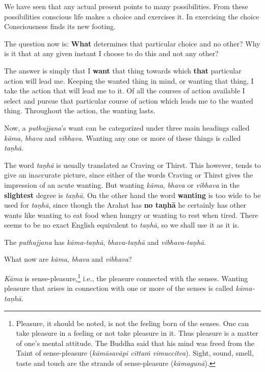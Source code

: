 We have seen that any actual present points to many possibilities. From
these possibilities conscious life makes a choice and exercises it. In
exercising the choice Consciousness finds its new footing.


The question now is: \textbf{What} determines that particular choice and no
other? Why is it that at any given instant I choose to do this and not
any other?


The answer is simply that I \textbf{want} that thing towards which \textbf{that}
particular action will lead me. Keeping the wanted thing in mind, or
wanting that thing, I take the action that will lead me to it. Of all
the courses of action available I select and pursue that particular
course of action which leads me to the wanted thing. Throughout the
action, the wanting lasts.


Now, a \emph{puthujjana}'s want can be categorized under three main
headings called \emph{kāma}, \emph{bhava} and \emph{vibhava}. Wanting any one or
more of these things is called \emph{taṇhā}.


The word \emph{taṇhā} is usually translated as Craving or Thirst. This
however, tends to give an inaccurate picture, since either of the words
Craving or Thirst gives the impression of an acute wanting. But wanting
\emph{kāma}, \emph{bhava} or \emph{vibhava} in the \textbf{slightest} degree is \emph{taṇhā}.
On the other hand the word \textbf{wanting} is too wide to be used for
\emph{taṇhā}, since though the Arahat has \textbf{no taṇhā} he certainly has other
wants like wanting to eat food when hungry or wanting to rest when
tired. There seems to be no exact English equivalent to \emph{taṇhā}, so we
shall use it as it is.


The \emph{puthujjana} has \emph{kāma-taṇhā}, \emph{bhava-taṇhā} and \emph{vibhava-taṇhā}.


What now are \emph{kāma}, \emph{bhava} and \emph{vibhava}?


\emph{Kāma} is sense-pleasure,\footnote{Pleasure, it should be noted, is not the feeling born of the senses. One can take pleasure in a feeling or not take pleasure in it. Thus pleasure is a matter of one’s mental attitude. The Buddha said that his mind was freed from the Taint of sense-pleasure (\emph{kāmāsavāpi cittaṁ vimuccitva}). Sight, sound, smell, taste and touch are the strands of sense-pleasure (\emph{kāmagunā}).} i.e.,
the pleasure connected with the senses. Wanting pleasure that arises in
connection with one or more of the senses is called \emph{kāma-taṇhā}.


